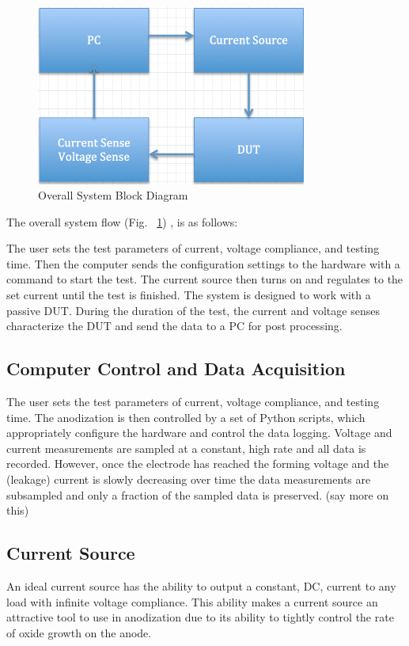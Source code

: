 \documentclass[journal]{IEEEtran}
\begin{document}
\begin{figure}[here]
\centering
\includegraphics[width=3.5in]{blockDiagram}
\caption{Overall System Block Diagram}
\label{fig:blockDiagram}
\end{figure}

The overall system flow (Fig. ~\ref{fig:blockDiagram}) , is as follows:

The user sets the test parameters of current, voltage compliance, and testing time. Then the computer sends the configuration settings to the hardware with a command to start the test. The current source then turns on and regulates to the set current until the test is finished. The system is designed to work with a passive DUT. During the duration of the test, the current and voltage senses characterize the DUT and send the data to a PC for post processing.

\subsection{Computer Control and Data Acquisition}

The user sets the test parameters of current, voltage compliance, and testing time. The anodization is then controlled by a set of Python scripts, which appropriately configure the hardware and control the data logging. Voltage and current measurements are sampled at a constant, high rate and all data is recorded. However, once the electrode has reached the forming voltage and the (leakage) current is slowly decreasing over time the data measurements are subsampled and only a fraction of the sampled data is preserved.  (say more on this)

\subsection{Current Source}

An ideal current source has the ability to output a constant, DC, current to any load with infinite voltage compliance. This ability makes a current source an attractive tool to use in anodization due to its ability to tightly control the rate of oxide growth on the anode.
\end{document}
